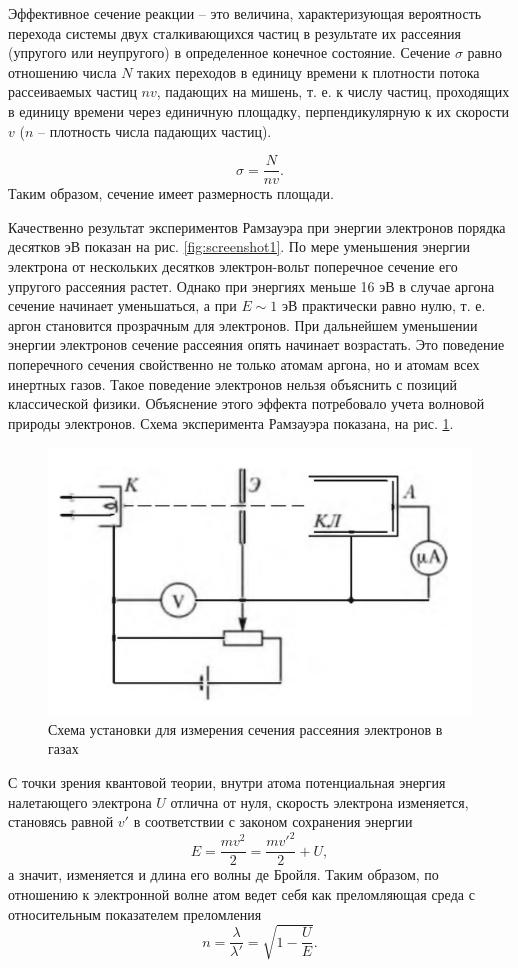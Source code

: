 \documentclass[a4paper, 12pt]{article}
\begin{document}
Эффективное сечение реакции -- это величина, характеризующая вероятность перехода системы двух сталкивающихся частиц в результате их рассеяния (упругого или неупругого) в определенное конечное состояние. Сечение $ \sigma $ равно отношению числа $ N $ таких переходов в единицу времени к плотности потока рассеиваемых частиц $ n v $, падающих на мишень, т. е. к числу частиц, проходящих в единицу времени через единичную площадку, перпендикулярную к их скорости $ v $ ($ n $ -- плотность числа падающих частиц).

\begin{equation}\label{eq:sigma}
	\sigma = \frac{N}{n v}.
\end{equation}
Таким образом, сечение имеет размерность площади.

Качественно результат экспериментов Рамзауэра при энергии электронов порядка десятков эВ показан на рис. \ref{fig:screenshot1}.
По мере уменьшения энергии электрона от нескольких десятков электрон-вольт поперечное сечение его упругого рассеяния растет. Однако при энергиях меньше 16 эВ в случае аргона сечение начинает уменьшаться, а при $ E \sim 1 $ эВ практически равно нулю, т. е. аргон становится прозрачным для электронов. При дальнейшем уменьшении энергии электронов сечение рассеяния опять начинает возрастать. Это поведение поперечного сечения свойственно не только атомам аргона, но и атомам всех инертных газов. Такое поведение электронов нельзя объяснить с позиций классической физики. Объяснение этого эффекта потребовало учета волновой природы электронов. Схема эксперимента Рамзауэра показана, на рис. \ref{fig:screenshot2}.

\begin{figure}[h!]
	\centering
	\includegraphics[width=0.5\linewidth]{Screenshot_2}
	\caption{Схема установки для измерения сечения рассеяния электронов в газах}
	\label{fig:screenshot2}
\end{figure}

С точки зрения квантовой теории, внутри атома потенциальная энергия налетающего электрона $ U $ отлична от нуля, скорость электрона изменяется, становясь равной $ v' $ в соответствии с законом сохранения энергии
\begin{equation*}
	E = \frac{m v^2}{2} = \frac{m v'^2}{2}+ U,
\end{equation*}
а значит, изменяется и длина его волны де Бройля. Таким образом, по отношению к электронной волне атом ведет себя как преломляющая среда с относительным показателем преломления
\begin{equation*}
	n = \frac{\lambda}{\lambda'} = \sqrt{1-\frac{U}{E}}.
\end{equation*}
\end{document}
